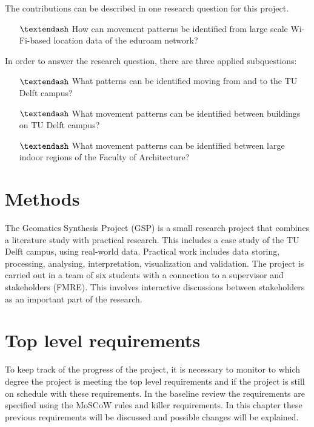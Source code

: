 The contributions can be described in one research question for this project.
\begin{itemize}
\item[$\textendash$] How can movement patterns be identified from large scale Wi-Fi-based location data of the eduroam network?
\end{itemize}
In order to answer the research question, there are three applied subquestions:
\begin{itemize}
\item[$\textendash$] What patterns can be identified moving from and to the TU Delft campus?
\item[$\textendash$] What movement patterns can be identified between buildings on TU Delft campus?
\item[$\textendash$] What movement patterns can be identified between large indoor regions of the Faculty of Architecture?
\end{itemize}









\section{Methods}\label{methods}
The Geomatics Synthesis Project (GSP) is a small research project that combines a literature study with practical research. This includes a case study of the TU Delft campus, using real-world data. Practical work includes data storing, processing, analysing, interpretation, visualization and validation. The project is carried out in a team of six students with a connection to a supervisor and stakeholders (FMRE). This involves interactive discussions between stakeholders as an important part of the research. 


\section{Top level requirements}
To keep track of the progress of the project, it is necessary to monitor to which degree the project is meeting the top level requirements and if the project is still on schedule with these requirements. In the baseline review the requirements are specified using the MoSCoW rules and killer requirements. In this chapter these previous requirements will be discussed and possible changes will be explained.

